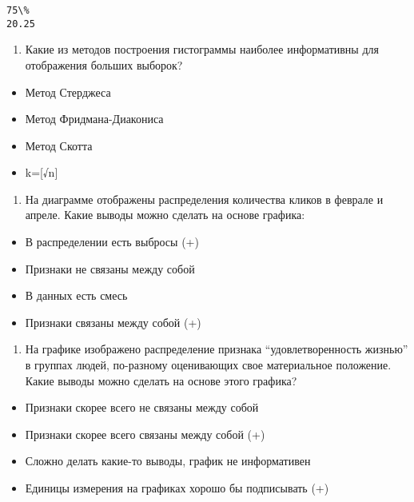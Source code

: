 \documentclass[11pt]{article}
\providecommand{\tightlist}{%
      \setlength{\itemsep}{0pt}\setlength{\parskip}{0pt}}
\begin{document}
    
    \begin{Verbatim}[commandchars=\\\{\}]
  75\% 
20.25 

    \end{Verbatim}

    \begin{enumerate}
\def\labelenumi{\arabic{enumi})}
\setcounter{enumi}{7}
\tightlist
\item
  Какие из методов построения гистограммы наиболее информативны для
  отображения больших выборок?
\end{enumerate}

\begin{itemize}
\tightlist
\item
  Метод Стерджеса
\item
  Метод Фридмана-Диакониса
\item
  Метод Скотта
\item
  k={[}√n{]}
\end{itemize}

    \begin{enumerate}
\def\labelenumi{\arabic{enumi})}
\setcounter{enumi}{8}
\tightlist
\item
  На диаграмме отображены распределения количества кликов в феврале и
  апреле. Какие выводы можно сделать на основе графика:
\end{enumerate}

\begin{itemize}
\tightlist
\item
  В распределении есть выбросы (+)
\item
  Признаки не связаны между собой
\item
  В данных есть смесь
\item
  Признаки связаны между собой (+)
\end{itemize}

    \begin{enumerate}
\def\labelenumi{\arabic{enumi})}
\setcounter{enumi}{9}
\tightlist
\item
  На графике изображено распределение признака ``удовлетворенность
  жизнью'' в группах людей, по-разному оценивающих свое материальное
  положение. Какие выводы можно сделать на основе этого графика?
\end{enumerate}

\begin{itemize}
\tightlist
\item
  Признаки скорее всего не связаны между собой
\item
  Признаки скорее всего связаны между собой (+)
\item
  Сложно делать какие-то выводы, график не информативен
\item
  Единицы измерения на графиках хорошо бы подписывать (+)
\end{itemize}
\end{document}
